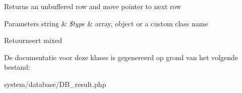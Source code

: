 Returns an unbuffered row and move pointer to next row


\begin{DoxyParams}[1]{Parameters}
string & {\em \$type} & \textquotesingle{}array\textquotesingle{}, \textquotesingle{}object\textquotesingle{} or a custom class name \\
\hline
\end{DoxyParams}
\begin{DoxyReturn}{Retourneert}
mixed 
\end{DoxyReturn}


De documentatie voor deze klasse is gegenereerd op grond van het volgende bestand\+:\begin{DoxyCompactItemize}
\item 
system/database/D\+B\+\_\+result.\+php\end{DoxyCompactItemize}
